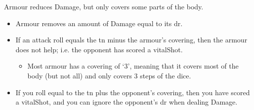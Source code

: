 Armour reduces Damage, but only covers some parts of the body.

\begin{itemize}
  \item
  Armour removes an amount of Damage equal to its \gls{dr}.
  \item
  If an attack roll equals the \gls{tn} minus the armour's \gls{covering}, then the armour does not help; i.e. the opponent has scored a \gls{vitalShot}.
  \begin{itemize}
    \item
  Most armour has a \gls{covering} of `3', meaning that it covers most of the body (but not all) and only covers 3 steps of the dice.
  \end{itemize}
  \item
  If you roll equal to the \gls{tn} plus the opponent's \gls{covering}, then you have scored a \gls{vitalShot}, and you can ignore the opponent's \gls{dr} when dealing Damage.
\end{itemize}
